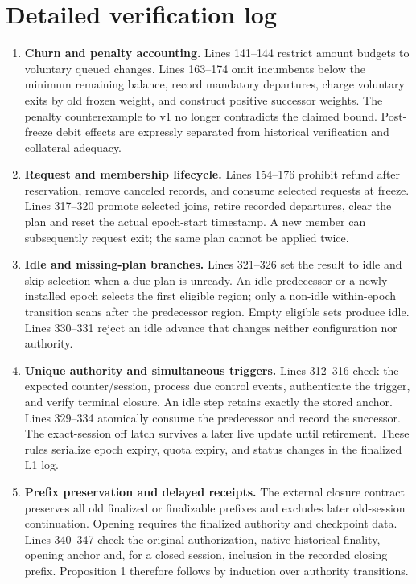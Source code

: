 \documentclass[11pt,a4paper]{article}
\begin{document}
\section*{Detailed verification log}
\begin{enumerate}[leftmargin=*,itemsep=7pt]
\item \textbf{Churn and penalty accounting.}
Lines 141--144 restrict amount budgets to voluntary queued changes.
Lines 163--174 omit incumbents below the minimum remaining balance,
record mandatory departures, charge voluntary exits by old frozen weight,
and construct positive successor weights. The penalty counterexample to
v1 no longer contradicts the claimed bound. Post-freeze debit effects are
expressly separated from historical verification and collateral adequacy.

\item \textbf{Request and membership lifecycle.}
Lines 154--176 prohibit refund after reservation, remove canceled records,
and consume selected requests at freeze. Lines 317--320 promote selected
joins, retire recorded departures, clear the plan and reset the actual
epoch-start timestamp. A new member can subsequently request exit;
the same plan cannot be applied twice.

\item \textbf{Idle and missing-plan branches.}
Lines 321--326 set the result to idle and skip selection when a due plan
is unready. An idle predecessor or a newly installed epoch selects the
first eligible region; only a non-idle within-epoch transition scans after
the predecessor region. Empty eligible sets produce idle. Lines 330--331
reject an idle advance that changes neither configuration nor authority.

\item \textbf{Unique authority and simultaneous triggers.}
Lines 312--316 check the expected counter/session, process due control
events, authenticate the trigger, and verify terminal closure. An idle
step retains exactly the stored anchor. Lines 329--334 atomically consume
the predecessor and record the successor. The exact-session off latch
survives a later live update until retirement. These rules serialize
epoch expiry, quota expiry, and status changes in the finalized L1 log.

\item \textbf{Prefix preservation and delayed receipts.}
The external closure contract preserves all old finalized or finalizable
prefixes and excludes later old-session continuation. Opening requires
the finalized authority and checkpoint data. Lines 340--347 check the
original authorization, native historical finality, opening anchor and,
for a closed session, inclusion in the recorded closing prefix.
Proposition 1 therefore follows by induction over authority transitions.


\end{enumerate}
\end{document}
